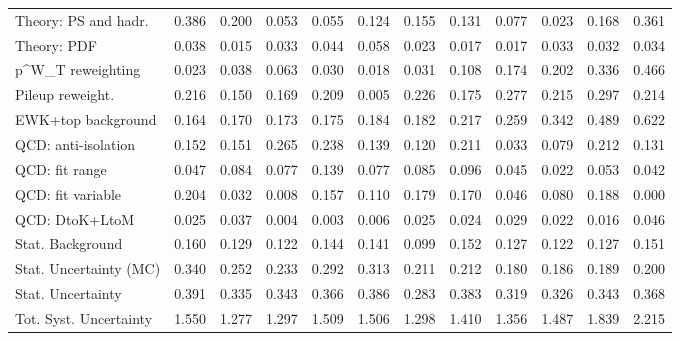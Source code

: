 \begin{tabular}{l|p{0.6cm}p{0.6cm}p{0.6cm}p{0.6cm}p{0.6cm}p{0.6cm}p{0.6cm}p{0.6cm}p{0.6cm}p{0.6cm}p{0.6cm}}
Theory: PS and hadr.                     & 0.386 & 0.200 & 0.053 & 0.055 & 0.124 & 0.155 & 0.131 & 0.077 & 0.023 & 0.168 & 0.361 \\
Theory: PDF                              & 0.038 & 0.015 & 0.033 & 0.044 & 0.058 & 0.023 & 0.017 & 0.017 & 0.033 & 0.032 & 0.034 \\
p^{W}_{T} reweighting                    & 0.023 & 0.038 & 0.063 & 0.030 & 0.018 & 0.031 & 0.108 & 0.174 & 0.202 & 0.336 & 0.466 \\
Pileup reweight.                         & 0.216 & 0.150 & 0.169 & 0.209 & 0.005 & 0.226 & 0.175 & 0.277 & 0.215 & 0.297 & 0.214 \\
EWK+top background                       & 0.164 & 0.170 & 0.173 & 0.175 & 0.184 & 0.182 & 0.217 & 0.259 & 0.342 & 0.489 & 0.622 \\
QCD: anti-isolation                      & 0.152 & 0.151 & 0.265 & 0.238 & 0.139 & 0.120 & 0.211 & 0.033 & 0.079 & 0.212 & 0.131 \\
QCD: fit range                           & 0.047 & 0.084 & 0.077 & 0.139 & 0.077 & 0.085 & 0.096 & 0.045 & 0.022 & 0.053 & 0.042 \\
QCD: fit variable                        & 0.204 & 0.032 & 0.008 & 0.157 & 0.110 & 0.179 & 0.170 & 0.046 & 0.080 & 0.188 & 0.000 \\
QCD: DtoK+LtoM                           & 0.025 & 0.037 & 0.004 & 0.003 & 0.006 & 0.025 & 0.024 & 0.029 & 0.022 & 0.016 & 0.046 \\
Stat. Background                         & 0.160 & 0.129 & 0.122 & 0.144 & 0.141 & 0.099 & 0.152 & 0.127 & 0.122 & 0.127 & 0.151 \\
Stat. Uncertainty (MC)                   & 0.340 & 0.252 & 0.233 & 0.292 & 0.313 & 0.211 & 0.212 & 0.180 & 0.186 & 0.189 & 0.200 \\
\hline
Stat. Uncertainty                        & 0.391 & 0.335 & 0.343 & 0.366 & 0.386 & 0.283 & 0.383 & 0.319 & 0.326 & 0.343 & 0.368 \\
\hline
Tot. Syst. Uncertainty                   & 1.550 & 1.277 & 1.297 & 1.509 & 1.506 & 1.298 & 1.410 & 1.356 & 1.487 & 1.839 & 2.215 \\
\hline
\end{tabular}

